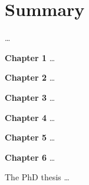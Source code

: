 \chapter{Summary}
\label{cha:Summary}

\dots

\textbf{Chapter 1} \dots

\textbf{Chapter 2} \dots

\textbf{Chapter 3} \dots

\textbf{Chapter 4} \dots

\textbf{Chapter 5} \dots

\textbf{Chapter 6} \dots

The PhD thesis \dots
